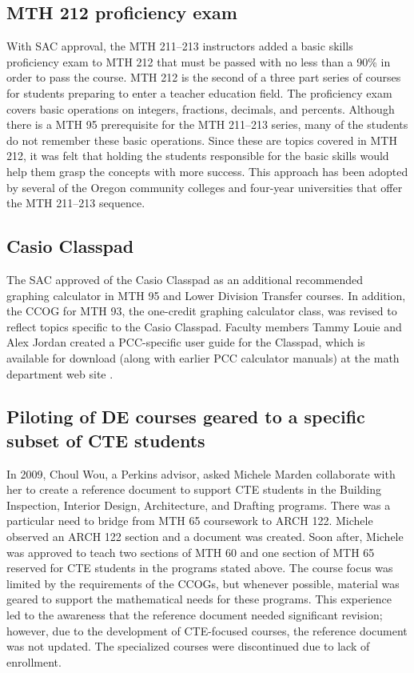 \subsection{MTH 212 proficiency exam}
With SAC approval, the MTH 211--213 instructors added a basic skills proficiency exam to MTH 212 that must be passed with no less than a 90\% in order to pass the course.
MTH 212 is the second of a three part series of courses for students preparing to enter a teacher education field.
The proficiency exam covers basic operations on integers, fractions, decimals, and percents.
Although there is a MTH 95 prerequisite for the MTH 211--213 series, many of the students do not remember these basic operations.
Since these are topics covered in MTH 212, it was felt that holding the students responsible for the basic skills would help them grasp the concepts with more success.
This approach has been adopted by several of the Oregon community colleges and four-year universities that offer the MTH 211--213 sequence.

\subsection{Casio Classpad}
The SAC approved of the Casio Classpad as an additional recommended graphing calculator in MTH 95 and Lower Division Transfer courses.
In addition, the CCOG for MTH 93, the one-credit graphing calculator class, was revised to reflect topics specific to the Casio Classpad.
Faculty members Tammy Louie and Alex Jordan created a PCC-specific user guide for the Classpad, which is available for download (along with earlier PCC calculator manuals) at the math department web site \cite{pccmathdept}.

\subsection{Piloting of DE courses geared to a specific subset of CTE students}
In 2009, Choul Wou, a Perkins advisor, asked Michele Marden collaborate with her to create a reference document to support CTE students in the Building Inspection, Interior Design, Architecture, and Drafting programs.
There was a particular need to bridge from MTH 65 coursework to ARCH 122.
Michele observed an ARCH 122 section and a document was created.
Soon after, Michele was approved to teach two sections of MTH 60 and one section of MTH 65 reserved for CTE students in the programs stated above.
The course focus was limited by the requirements of the CCOGs, but whenever possible, material was geared to support the mathematical needs for these programs.
This experience led to the awareness that the reference document needed significant revision; however, due to the development of CTE-focused courses, the reference document was not updated.
The specialized courses were discontinued due to lack of enrollment.

